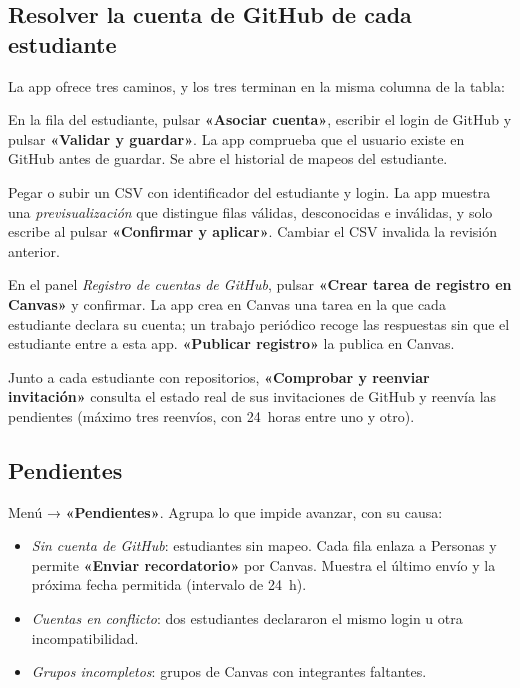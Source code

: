 \documentclass[11pt,a4paper]{article}
\newcommand{\ui}[1]{\textbf{«#1»}}        %
\begin{document}
\subsection{Resolver la cuenta de GitHub de cada estudiante}

La app ofrece tres caminos, y los tres terminan en la misma columna de la tabla:

\begin{description}[style=nextline,leftmargin=0.6cm]
  \item[Asociación manual] En la fila del estudiante, pulsar \ui{Asociar cuenta}, escribir el login de GitHub y pulsar \ui{Validar y guardar}. La app comprueba que el usuario existe en GitHub antes de guardar. Se abre el historial de mapeos del estudiante.
  \item[Importación CSV] Pegar o subir un CSV con identificador del estudiante y login. La app muestra una \emph{previsualización} que distingue filas válidas, desconocidas e inválidas, y solo escribe al pulsar \ui{Confirmar y aplicar}. Cambiar el CSV invalida la revisión anterior.
  \item[Registro desde Canvas] En el panel \emph{Registro de cuentas de GitHub}, pulsar \ui{Crear tarea de registro en Canvas} y confirmar. La app crea en Canvas una tarea en la que cada estudiante declara su cuenta; un trabajo periódico recoge las respuestas sin que el estudiante entre a esta app. \ui{Publicar registro} la publica en Canvas.
\end{description}

Junto a cada estudiante con repositorios, \ui{Comprobar y reenviar invitación} consulta el estado real de sus invitaciones de GitHub y reenvía las pendientes (máximo tres reenvíos, con 24~horas entre uno y otro).

\subsection{Pendientes}

Menú → \ui{Pendientes}. Agrupa lo que impide avanzar, con su causa:

\begin{itemize}
  \item \emph{Sin cuenta de GitHub}: estudiantes sin mapeo. Cada fila enlaza a Personas y permite \ui{Enviar recordatorio} por Canvas. Muestra el último envío y la próxima fecha permitida (intervalo de 24~h).
  \item \emph{Cuentas en conflicto}: dos estudiantes declararon el mismo login u otra incompatibilidad.
  \item \emph{Grupos incompletos}: grupos de Canvas con integrantes faltantes.
\end{itemize}
\end{document}
